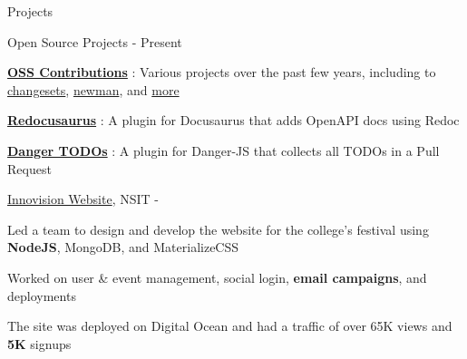 \documentclass[../resume.tex]{subfiles}
\begin{document}
\begin{rSection}{Projects}


\begin{rSubsection}
    {Open Source Projects}
    {  - Present}
    {}{}

    \item \href{https://rohit.page/contributions/?utm_source=resume&utm_medium=projects&utm_campaign=oss}{\textbf{OSS Contributions}}
        : Various projects over the past few years, including to 
        \href{https://rohit.page/contributions/?utm_source=resume&utm_medium=projects&utm_campaign=oss#oss-changesets/changesets}{changesets},
        \href{https://rohit.page/contributions/?utm_source=resume&utm_medium=projects&utm_campaign=newman#oss-postmanlabs/newman}{newman},
        and \href{https://rohit.page/contributions/?utm_source=resume&utm_medium=projects&utm_campaign=oss}{more}
    \item \href{https://rohit.page/blog/projects/openapi-for-docusaurus/?utm_source=resume&utm_medium=projects&utm_campaign=redocusaurus}{\textbf{Redocusaurus}}
        : A plugin for Docusaurus that adds OpenAPI docs using Redoc
    \item \href{https://rohit.page/blog/projects/dangerjs-plugin-todos/?utm_source=resume&utm_medium=projects&utm_campaign=danger}{\textbf{Danger TODOs}}
        : A plugin for Danger-JS that collects all TODOs in a Pull Request

\end{rSubsection}

\begin{rSubsection}
    {\href{https://go.rohit.page/inno}{Innovision Website}, {\nem NSIT}}
    {  - }
    {}{}

    \item Led a team to design and develop the website for the college's festival using \textbf{NodeJS}, MongoDB, and MaterializeCSS
    \item Worked on user \& event management, social login, \textbf{email campaigns}, and deployments
    \item The site was deployed on Digital Ocean and had a traffic of over 65K views and \textbf{5K} signups


\end{rSubsection}
\end{rSection}
\end{document}
